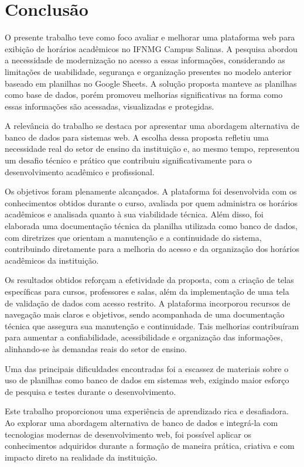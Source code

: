 \chapter{Conclusão} 
\label{cap6_conclusao} 

O presente trabalho teve como foco avaliar e melhorar uma plataforma web para exibição de horários acadêmicos no IFNMG Campus Salinas. A pesquisa abordou a necessidade de modernização no acesso a essas informações, considerando as limitações de usabilidade, segurança e organização presentes no modelo anterior baseado em planilhas no Google Sheets. A solução proposta manteve as planilhas como base de dados, porém promoveu melhorias significativas na forma como essas informações são acessadas, visualizadas e protegidas.

A relevância do trabalho se destaca por apresentar uma abordagem alternativa de banco de dados para sistemas web. A escolha dessa proposta refletiu uma necessidade real do setor de ensino da instituição e, ao mesmo tempo, representou um desafio técnico e prático que contribuiu significativamente para o desenvolvimento acadêmico e profissional.

Os objetivos foram plenamente alcançados. A plataforma foi desenvolvida com os conhecimentos obtidos durante o curso, avaliada por quem administra os horários acadêmicos e analisada quanto à sua viabilidade técnica. Além disso, foi elaborada uma documentação técnica da planilha utilizada como banco de dados, com diretrizes que orientam a manutenção e a continuidade do sistema, contribuindo diretamente para a melhoria do acesso e da organização dos horários acadêmicos da instituição.

Os resultados obtidos reforçam a efetividade da proposta, com a criação de telas específicas para cursos, professores e salas, além da implementação de uma tela de validação de dados com acesso restrito. A plataforma incorporou recursos de navegação mais claros e objetivos, sendo acompanhada de uma documentação técnica que assegura sua manutenção e continuidade. Tais melhorias contribuíram para aumentar a confiabilidade, acessibilidade e organização das informações, alinhando-se às demandas reais do setor de ensino.

Uma das principais dificuldades encontradas foi a escassez de materiais sobre o uso de planilhas como banco de dados em sistemas web, exigindo maior esforço de pesquisa e testes durante o desenvolvimento.

Este trabalho proporcionou uma experiência de aprendizado rica e desafiadora. Ao explorar uma abordagem alternativa de banco de dados e integrá-la com tecnologias modernas de desenvolvimento web, foi possível aplicar os conhecimentos adquiridos durante a formação de maneira prática, criativa e com impacto direto na realidade da instituição.

